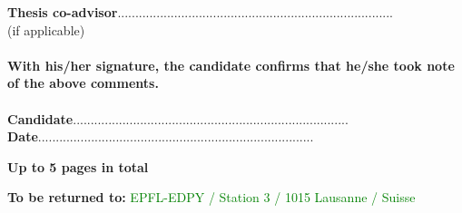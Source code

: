 \documentclass[11pt,titlepage]{article}
\begin{document}
\noindent \textbf{Thesis co-advisor}\hspace{5.7cm}..............................................................................\\
\noindent  (if applicable)\\\\

\noindent \textbf{With his/her signature, the candidate confirms that he/she took note of the above comments.}\\\\
\textbf{Candidate}\hspace{7cm}..............................................................................\vspace{0.5cm}\\

\noindent \textbf{Date}\hspace{8.05cm}..............................................................................\\

\vspace{0.8cm}
\begin{center}
\textbf{Up to 5 pages in total}
\end{center}
\begin{center}
\textbf{To be returned to:} \textcolor{green}{EPFL-EDPY / Station 3 / 1015 Lausanne / Suisse}
\end{center}
\end{document}
